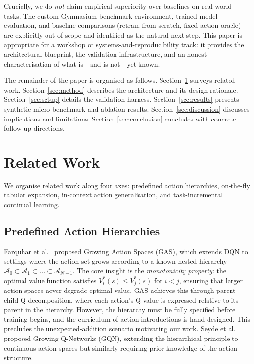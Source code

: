 \documentclass{article}
\begin{document}
Crucially, we do \emph{not} claim empirical superiority over baselines on
real-world tasks. The custom Gymnasium benchmark environment, trained-model
evaluation, and baseline comparisons (retrain-from-scratch, fixed-action
oracle) are explicitly out of scope and identified as the natural next step.
This paper is appropriate for a workshop or systems-and-reproducibility track:
it provides the architectural blueprint, the validation infrastructure, and an
honest characterisation of what is---and is not---yet known.

The remainder of the paper is organised as follows. Section~\ref{sec:related}
surveys related work. Section~\ref{sec:method} describes the architecture and
its design rationale. Section~\ref{sec:setup} details the validation harness.
Section~\ref{sec:results} presents synthetic micro-benchmark and ablation
results. Section~\ref{sec:discussion} discusses implications and limitations.
Section~\ref{sec:conclusion} concludes with concrete follow-up directions.


\section{Related Work}
\label{sec:related}

We organise related work along four axes: predefined action hierarchies,
on-the-fly tabular expansion, in-context action generalisation, and
task-incremental continual learning.

\subsection{Predefined Action Hierarchies}

Farquhar et al.~\cite{farquhar2020growing} proposed Growing Action Spaces
(GAS), which extends DQN to settings where the action set grows according to a
known nested hierarchy $\mathcal{A}_0 \subset \mathcal{A}_1 \subset \dots
\subset \mathcal{A}_{N-1}$. The core insight is the \emph{monotonicity
property}: the optimal value function satisfies $V^*_i(s) \leq V^*_j(s)$ for
$i < j$, ensuring that larger action spaces never degrade optimal value. GAS
achieves this through parent-child Q-decomposition, where each action's
Q-value is expressed relative to its parent in the hierarchy. However, the
hierarchy must be fully specified before training begins, and the curriculum of
action introductions is hand-designed. This precludes the unexpected-addition
scenario motivating our work. Seyde et
al.~\cite{seyde2024growing} proposed Growing Q-Networks (GQN), extending the
hierarchical principle to continuous action spaces but similarly requiring
prior knowledge of the action structure.
\end{document}
